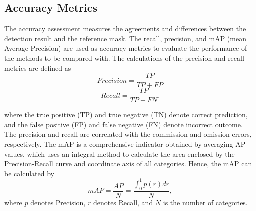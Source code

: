 \subsection{Accuracy Metrics}
The accuracy assessment measures the agreements and differences between the detection result and the reference mask. The recall, precision, and mAP (mean Average Precision) are used as accuracy metrics to evaluate the performance of the methods to be compared with. The calculations of the precision and recall metrics are defined as
\begin{equation}
	Precision=\frac{TP}{TP+FP}
\end{equation}
\begin{equation}
	Recall=\frac{TP}{TP+FN}.
\end{equation}
\begin{table}[htpb]
	\small
\centering
\vspace{-0.1in}
\end{table} where the true positive (TP) and true negative (TN) denote correct prediction, and the false positive (FP) and false negative (FN) denote incorrect outcome. The precision and recall are correlated with the commission and omission errors, respectively. The mAP is a comprehensive indicator obtained by averaging AP values, which uses an integral method to calculate the area enclosed by the Precision-Recall curve and coordinate axis of all categories. Hence, the mAP can be calculated by
\begin{equation}
	mAP=\frac{AP}{N}=\frac{\int_{0}^{1}{p(r)dr}}{N},
\end{equation}
where  $p$ denotes Precision, $r$ denotes Recall, and $N$ is the number of categories. 


